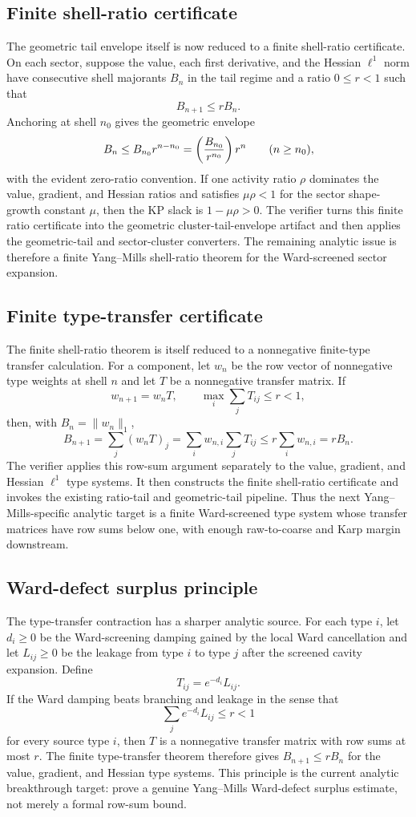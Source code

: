 \subsection{Finite shell-ratio certificate}
The geometric tail envelope itself is now reduced to a finite shell-ratio
certificate. On each sector, suppose the value, each first derivative, and the
Hessian $\ell^1$ norm have consecutive shell majorants $B_n$ in the tail regime
and a ratio $0\le r<1$ such that
\[
  B_{n+1}\le rB_n .
\]
Anchoring at shell $n_0$ gives the geometric envelope
\[
  B_n\le B_{n_0}r^{n-n_0}
      =\left({B_{n_0}\over r^{n_0}}\right)r^n
      \qquad(n\ge n_0),
\]
with the evident zero-ratio convention. If one activity ratio $\rho$ dominates
the value, gradient, and Hessian ratios and satisfies $\mu\rho<1$ for the
sector shape-growth constant $\mu$, then the KP slack is $1-\mu\rho>0$. The
verifier turns this finite ratio certificate into the geometric
cluster-tail-envelope artifact and then applies the geometric-tail and
sector-cluster converters. The remaining analytic issue is therefore a finite
Yang--Mills shell-ratio theorem for the Ward-screened sector expansion.

\subsection{Finite type-transfer certificate}
The finite shell-ratio theorem is itself reduced to a nonnegative finite-type
transfer calculation. For a component, let $w_n$ be the row vector of
nonnegative type weights at shell $n$ and let $T$ be a nonnegative transfer
matrix. If
\[
  w_{n+1}=w_nT,\qquad \max_i\sum_j T_{ij}\le r<1,
\]
then, with $B_n=\|w_n\|_1$,
\[
  B_{n+1}=\sum_j(w_nT)_j
        =\sum_i w_{n,i}\sum_jT_{ij}
        \le r\sum_iw_{n,i}=rB_n .
\]
The verifier applies this row-sum argument separately to the value, gradient,
and Hessian $\ell^1$ type systems. It then constructs the finite shell-ratio
certificate and invokes the existing ratio-tail and geometric-tail pipeline.
Thus the next Yang--Mills-specific analytic target is a finite Ward-screened
type system whose transfer matrices have row sums below one, with enough
raw-to-coarse and Karp margin downstream.

\subsection{Ward-defect surplus principle}
The type-transfer contraction has a sharper analytic source. For each type
$i$, let $d_i\ge 0$ be the Ward-screening damping gained by the local Ward
cancellation and let $L_{ij}\ge 0$ be the leakage from type $i$ to type $j$
after the screened cavity expansion. Define
\[
  T_{ij}=e^{-d_i}L_{ij}.
\]
If the Ward damping beats branching and leakage in the sense that
\[
  \sum_j e^{-d_i}L_{ij}\le r<1
\]
for every source type $i$, then $T$ is a nonnegative transfer matrix with row
sums at most $r$. The finite type-transfer theorem therefore gives
$B_{n+1}\le rB_n$ for the value, gradient, and Hessian type systems. This
principle is the current analytic breakthrough target: prove a genuine
Yang--Mills Ward-defect surplus estimate, not merely a formal row-sum bound.


